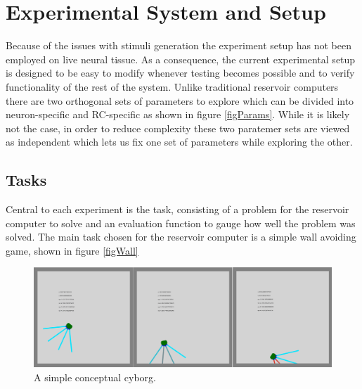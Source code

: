 \chapter{Experimental System and Setup}
Because of the issues with stimuli generation the experiment setup has not been
employed on live neural tissue.
As a consequence, the current experimental setup is designed to be easy to
modify whenever testing becomes possible and to verify functionality of the rest
of the system.
Unlike traditional reservoir computers there are two orthogonal sets of
parameters to explore which can be divided into neuron-specific and RC-specific
as shown in figure \ref{figParams}.
While it is likely not the case, in order to reduce complexity these two
paratemer sets are viewed as independent which lets us fix one set of parameters
while exploring the other.
\section{Tasks}
Central to each experiment is the task, consisting of a problem for the
reservoir computer to solve and an evaluation function to gauge how well the
problem was solved.
The main task chosen for the reservoir computer is a simple wall avoiding game,
shown in figure \ref{figWall}

\begin{figure}[h!]
  \centering
  \includegraphics[width=1\textwidth]{fig/TAC/game2.png}
  \caption{A simple conceptual cyborg.}
  \label{cyborgOverviewSimple}
\end{figure}
\cleardoublepage

